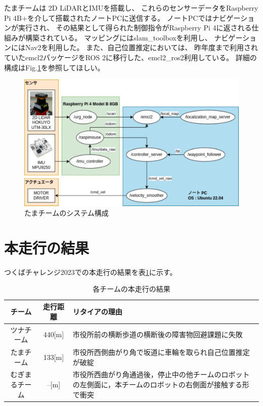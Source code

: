 \documentclass[twocolumn,9pt]{jsproceedings}
\begin{document}
たまチームは 2D LiDARとIMUを搭載し、
これらのセンサーデータをRaspberry Pi 4B+を介して搭載されたノートPCに送信する。
ノートPCではナビゲーションが実行され、
その結果として得られた制御指令がRaspberry Pi 4に返される仕組みが構築されている。
マッピングにはslam\_toolboxを利用し、
ナビゲーションにはNav2を利用した。
また、自己位置推定においては、
昨年度まで利用されていたemcl2パッケージをROS 2に移行した、emcl2\_ros2利用している。
詳細の構成はFig.\ref{fig:tama_system_diagram}を参照してほしい。

\begin{figure}[h]
    \begin{center}
        \includegraphics[width=1.0\linewidth]{figs/tama_system_diagram.pdf}
        \caption{たまチームのシステム構成}
        \label{fig:tama_system_diagram}
    \end{center}
\end{figure}


\section{本走行の結果}

つくばチャレンジ2023での本走行の結果を表\ref{MainRun}に示す。

\begin{table}[h]
  \caption{各チームの本走行の結果}
  \label{MainRun}
  \begin{tabular}{|c|c|p{4.0cm}|}
    \hline
    チーム         & 走行距離 & リタイアの理由                                                                                             \\
    \hline
    ツナチーム     & 440[m]   & 市役所前の横断歩道の横断後の障害物回避課題に失敗                                                           \\
    \hline
    たまチーム     & 133[m]   & 市役所西側曲がり角で坂道に車輪を取られ自己位置推定が破綻                                                   \\
    \hline
    むぎまるチーム & --[m]    & 市役所西曲がり角通過後，停止中の他チームのロボットの左側面に，本チームのロボットの右側面が接触する形で衝突 \\
    \hline
  \end{tabular}
\end{table}
\end{document}
